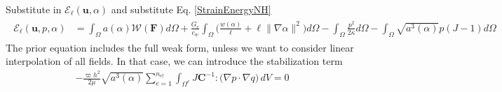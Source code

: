 \documentclass[12pt,3p]{article}
\numberwithin{equation}{section}
\begin{document}
Substitute in $\mathcal{E}_{\ell} (\boldsymbol{u}, \alpha )$ and substitute Eq. \ref{StrainEnergyNH}
\begin{align*}
\begin{split}
\mathcal{E}_{\ell}\left(\boldsymbol{u}, p, \alpha\right) &= \int_{\Omega} a(\alpha) \mathcal{W}(\mathbf{F}) d \Omega+\frac{G_{c}}{c_{w}} \int_{\Omega} \bigg(\frac{w(\alpha)}{\ell}+\ell\|\nabla \alpha\|^{2} \bigg) d \Omega- \int_{\Omega} \frac{p^{2}}{2 \kappa} d \Omega - \int_{\Omega} \sqrt{a^{3}(\alpha)} p(J-1) d \Omega 
\end{split}
\end{align*}
The prior equation includes the full weak form, unless we want to consider linear interpolation of all fields. In that case, we can introduce the stabilization term 
\begin{align*}
- \frac{\varpi h^2}{2\mu} \sqrt{a^3(\alpha)} \sum_{e=1}^{n_{el}}\int_{\Omega^{e}} J \mathbf{C}^{-1} : \big( \nabla p \cdot \nabla q \big) \,dV = 0 
\end{align*}
\end{document}
